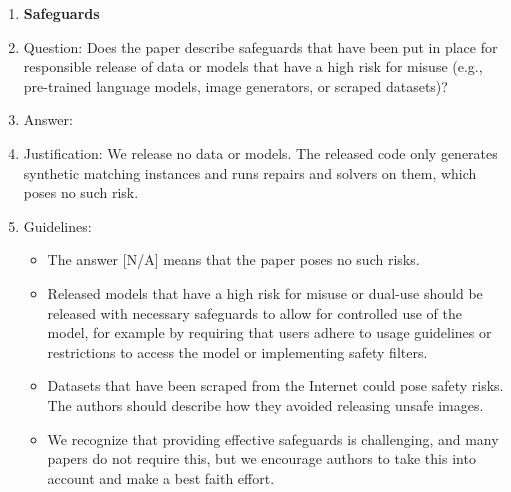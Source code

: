 \begin{enumerate}
\item {\bf Safeguards}
    \item[] Question: Does the paper describe safeguards that have been put in place for responsible release of data or models that have a high risk for misuse (e.g., pre-trained language models, image generators, or scraped datasets)?
    \item[] Answer: \answerNA{}
    \item[] Justification: We release no data or models. The released code only generates synthetic matching instances and runs repairs and solvers on them, which poses no such risk.
    \item[] Guidelines:
    \begin{itemize}
        \item The answer [N/A] means that the paper poses no such risks.
        \item Released models that have a high risk for misuse or dual-use should be released with necessary safeguards to allow for controlled use of the model, for example by requiring that users adhere to usage guidelines or restrictions to access the model or implementing safety filters.
        \item Datasets that have been scraped from the Internet could pose safety risks. The authors should describe how they avoided releasing unsafe images.
        \item We recognize that providing effective safeguards is challenging, and many papers do not require this, but we encourage authors to take this into account and make a best faith effort.
    \end{itemize}


\end{enumerate}
